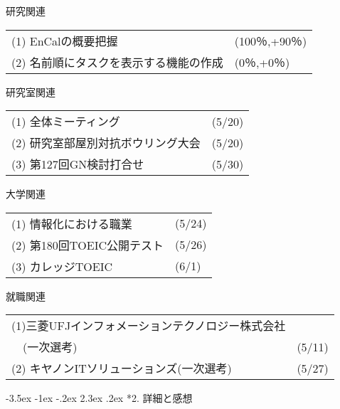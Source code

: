 \documentclass[fleqn, 14pt]{extarticlej}
\makeatletter
\def\section{\@startsection {section}{1}{\z@}%
{-3.5ex \@plus -1ex \@minus -.2ex}%
{2.3ex \@plus.2ex}%
{\sectionformat}}
\def\sectionformat{\normalsize}
\makeatother
\begin{document}
\begin{description}
  \itemsep -1mm

  \item[　1.1] 研究関連

    \begin{tabular}{p{11.8cm}l}
      (1) EnCalの概要把握&(100％,+90％)\\
(2) 名前順にタスクを表示する機能の作成&(0％,+0％)\\
    \end{tabular}

  \item[　1.2] 研究室関連

    \begin{tabular}{p{11.8cm}l}
      (1) 全体ミーティング&(5/20)\\
      (2) 研究室部屋別対抗ボウリング大会&(5/20)\\
      (3) 第127回GN検討打合せ&(5/30)\\

    \end{tabular}

  \item[　1.3] 大学関連

    \begin{tabular}{p{11.8cm}l}
    (1) 情報化における職業&(5/24)\\
(2) 第180回TOEIC公開テスト&(5/26)\\
    (3) カレッジTOEIC&(6/1)\\
    
\end{tabular}
  
  \item[　1.4] 就職関連

    \begin{tabular}{p{11.8cm}l}
(1)三菱UFJインフォメーションテクノロジー株式会社\\
　(一次選考)&(5/11)\\
(2) キヤノンITソリューションズ(一次選考)&(5/27)\\
    \end{tabular}
    

\end{description}

\vspace{-1.5em}
\section*{2. 詳細と感想}
\vspace{-1.0em}
\end{document}
